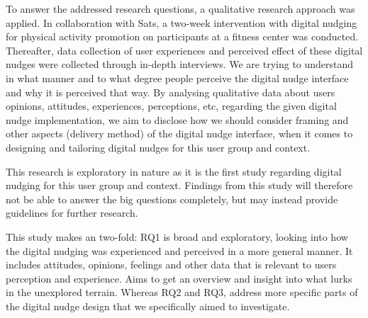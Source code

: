 



To answer the addressed research questions, a qualitative research approach was applied. In collaboration with Sats, a two-week intervention with digital nudging for physical activity promotion on participants at a fitness center was conducted. Thereafter, data collection of user experiences and perceived effect of these digital nudges were collected through in-depth interviews. We are trying to understand in what manner and to what degree people perceive the digital nudge interface and why it is perceived that way. By analysing qualitative data about users opinions, attitudes, experiences, perceptions, etc, regarding the given digital nudge implementation, we aim to disclose how we should consider framing and other aspects (delivery method) of the digital nudge interface, when it comes to designing and tailoring digital nudges for this user group and context. 

This research is exploratory in nature as it is the first study regarding digital nudging for this user group and context. Findings from this study will therefore not be able to answer the big questions completely, but may instead provide guidelines for further research. 

 This study makes an two-fold:  RQ1 is broad and exploratory,  looking into how the digital nudging was experienced and perceived in a more general manner. It includes attitudes, opinions, feelings and other data that is relevant to users perception and experience. Aims to get an overview and insight into what lurks in the unexplored terrain. Whereas RQ2 and RQ3, address more specific parts of the digital nudge design that we specifically aimed to investigate. 


